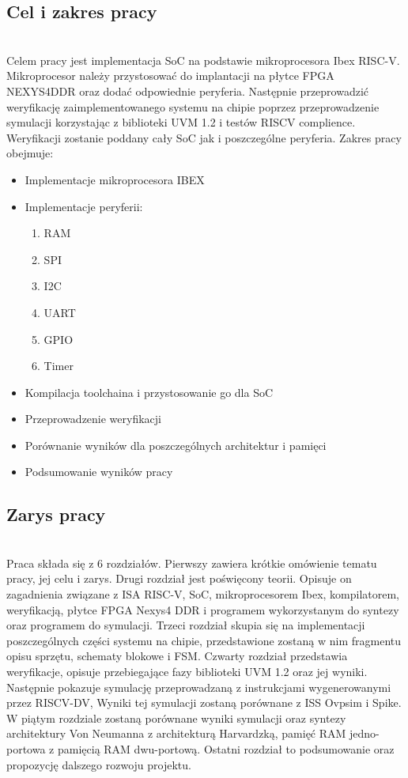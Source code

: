 \documentclass[11pt,a4paper]{article}
\begin{document}
	\subsection{Cel i zakres pracy}
	\hspace{5mm}
	\\
	Celem pracy jest implementacja SoC na podstawie mikroprocesora Ibex RISC-V. Mikroprocesor należy przystosować do implantacji na płytce FPGA NEXYS4DDR oraz dodać odpowiednie peryferia. Następnie przeprowadzić weryfikację zaimplementowanego systemu na chipie poprzez przeprowadzenie symulacji korzystając z biblioteki UVM 1.2 i testów RISCV complience. Weryfikacji zostanie poddany cały SoC jak i poszczególne peryferia.\newline
	Zakres pracy obejmuje:
	\begin{itemize}
	  \item Implementacje mikroprocesora IBEX
	  \item Implementacje peryferii:
	  \begin{enumerate}
	  	\item RAM
	  	\item SPI
	  	\item I2C
	  	\item UART
	  	\item GPIO
	  	\item Timer
	  \end{enumerate}
	  \item Kompilacja toolchaina i przystosowanie go dla SoC
	  \item Przeprowadzenie weryfikacji
  	  \item Porównanie wyników dla poszczególnych architektur i pamięci
  	  \item Podsumowanie wyników pracy
	\end{itemize}

	\subsection{Zarys pracy}
	\hspace{5mm}
	\\
	Praca składa się z 6 rozdziałów. Pierwszy zawiera krótkie omówienie tematu pracy, jej celu i zarys. Drugi rozdział jest poświęcony teorii. Opisuje on zagadnienia związane z ISA RISC-V, SoC, mikroprocesorem Ibex, kompilatorem, weryfikacją, płytce FPGA Nexys4 DDR i programem wykorzystanym do syntezy oraz programem do symulacji. Trzeci rozdział skupia się na implementacji poszczególnych części systemu na chipie, przedstawione zostaną w nim fragmentu opisu sprzętu, schematy blokowe i FSM. Czwarty rozdział przedstawia weryfikacje, opisuje przebiegające fazy biblioteki UVM 1.2 oraz jej wyniki. Następnie pokazuje symulację przeprowadzaną z instrukcjami wygenerowanymi przez RISCV-DV, Wyniki tej symulacji zostaną porównane z ISS Ovpsim i Spike. W piątym rozdziale zostaną porównane wyniki symulacji oraz syntezy architektury Von Neumanna z architekturą Harvardzką, pamięć RAM jedno-portowa z pamięcią RAM dwu-portową. Ostatni rozdział to podsumowanie oraz propozycję dalszego rozwoju projektu.
\newpage
	
\end{document}
